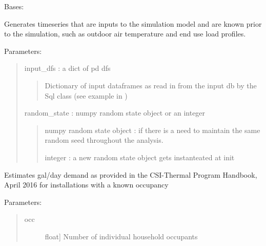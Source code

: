 \documentclass[letterpaper,10pt,english,openany]{sphinxmanual}
\begin{document}
\begin{fulllineitems}
\label{\detokenize{source/mswh.system:mswh.system.source_and_sink.SourceAndSink}}
Bases: 

Generates timeseries that are inputs to the simulation
model and are known prior to the simulation, such as
outdoor air temperature and end use load profiles.

Parameters:
\begin{quote}

input\_dfs : a dict of pd dfs
\begin{quote}

Dictionary of input dataframes
as read in from the input db by the Sql class
(see example in
)
\end{quote}

random\_state : numpy random state object or an integer
\begin{quote}

numpy random state object : if there is a need
to maintain the same random seed throughout the
analysis.

integer : a new random state object gets
instanteated at init
\end{quote}
\end{quote}

\begin{fulllineitems}
\label{\detokenize{source/mswh.system:mswh.system.source_and_sink.SourceAndSink.demand_estimate}}
Estimates gal/day demand as provided in the
CSI-Thermal Program Handbook, April 2016 for
installations with a known occupancy

Parameters:
\begin{quote}
\begin{description}
\item[{occ}] \leavevmode{[}float{]}
Number of individual household occupants

\end{description}
\end{quote}


\end{fulllineitems}
\end{fulllineitems}
\end{document}
